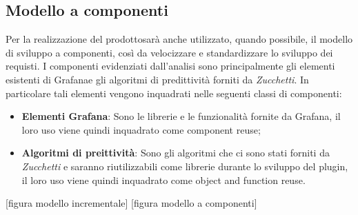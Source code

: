 

\subsection{Modello a componenti}
Per la realizzazione del prodotto\glosp sarà anche utilizzato, quando possibile, il modello di sviluppo a componenti, così da velocizzare e standardizzare lo sviluppo dei requisti.
I componenti evidenziati dall'analisi sono principalmente gli elementi esistenti di Grafana\glosp e gli algoritmi di predittività forniti da \textit{Zucchetti}.
In particolare tali elementi vengono inquadrati nelle seguenti classi di componenti:
\begin{itemize}
	\item \textbf{Elementi Grafana\glo}: Sono le librerie  e le funzionalità fornite da Grafana\glo, il loro uso viene quindi inquadrato come component reuse;
	\item \textbf{Algoritmi di preittività}: Sono gli algoritmi che ci sono stati forniti da \textit{Zucchetti} e saranno riutilizzabili come librerie durante lo sviluppo del plugin, il loro uso viene quindi inquadrato come object and function reuse.
\end{itemize}

[figura modello incrementale]
[figura modello a componenti]